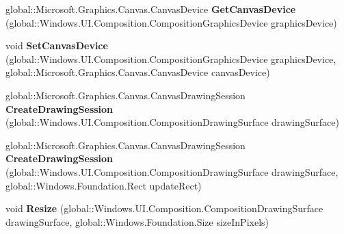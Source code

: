 \begin{DoxyCompactItemize}
global\+::\+Microsoft.\+Graphics.\+Canvas.\+Canvas\+Device {\bfseries Get\+Canvas\+Device} (global\+::\+Windows.\+U\+I.\+Composition.\+Composition\+Graphics\+Device graphics\+Device)
\item 
\mbox{\label{interface_microsoft_1_1_graphics_1_1_canvas_1_1_u_i_1_1_composition_1_1_i_canvas_composition_statics_a3fce2ed9ef29897b92f51b815d0c42d7}} 
void {\bfseries Set\+Canvas\+Device} (global\+::\+Windows.\+U\+I.\+Composition.\+Composition\+Graphics\+Device graphics\+Device, global\+::\+Microsoft.\+Graphics.\+Canvas.\+Canvas\+Device canvas\+Device)
\item 
\mbox{\label{interface_microsoft_1_1_graphics_1_1_canvas_1_1_u_i_1_1_composition_1_1_i_canvas_composition_statics_a742fc5f5398406c730e6f87b2755b86a}} 
global\+::\+Microsoft.\+Graphics.\+Canvas.\+Canvas\+Drawing\+Session {\bfseries Create\+Drawing\+Session} (global\+::\+Windows.\+U\+I.\+Composition.\+Composition\+Drawing\+Surface drawing\+Surface)
\item 
\mbox{\label{interface_microsoft_1_1_graphics_1_1_canvas_1_1_u_i_1_1_composition_1_1_i_canvas_composition_statics_a3be55117be22745ae6372f082447a79b}} 
global\+::\+Microsoft.\+Graphics.\+Canvas.\+Canvas\+Drawing\+Session {\bfseries Create\+Drawing\+Session} (global\+::\+Windows.\+U\+I.\+Composition.\+Composition\+Drawing\+Surface drawing\+Surface, global\+::\+Windows.\+Foundation.\+Rect update\+Rect)
\item 
\mbox{\label{interface_microsoft_1_1_graphics_1_1_canvas_1_1_u_i_1_1_composition_1_1_i_canvas_composition_statics_aa321ab037c7b505b333681f0b3bdc829}} 
void {\bfseries Resize} (global\+::\+Windows.\+U\+I.\+Composition.\+Composition\+Drawing\+Surface drawing\+Surface, global\+::\+Windows.\+Foundation.\+Size size\+In\+Pixels)
\item 
\mbox{\label{interface_microsoft_1_1_graphics_1_1_canvas_1_1_u_i_1_1_composition_1_1_i_canvas_composition_statics_abc5bb79cc44eecbedc66ea29c5052d3d}} 

\end{DoxyCompactItemize}
